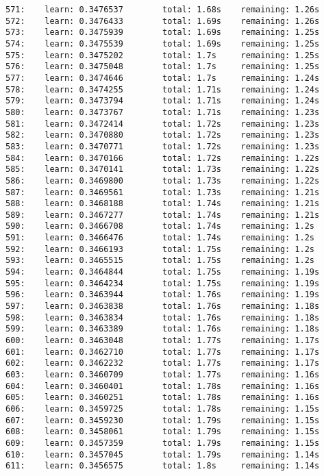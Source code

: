 \documentclass[11pt]{article}
\begin{document}
\begin{Verbatim}[commandchars=\\\{\}]
571:    learn: 0.3476537        total: 1.68s    remaining: 1.26s
572:    learn: 0.3476433        total: 1.69s    remaining: 1.26s
573:    learn: 0.3475939        total: 1.69s    remaining: 1.25s
574:    learn: 0.3475539        total: 1.69s    remaining: 1.25s
575:    learn: 0.3475202        total: 1.7s     remaining: 1.25s
576:    learn: 0.3475048        total: 1.7s     remaining: 1.25s
577:    learn: 0.3474646        total: 1.7s     remaining: 1.24s
578:    learn: 0.3474255        total: 1.71s    remaining: 1.24s
579:    learn: 0.3473794        total: 1.71s    remaining: 1.24s
580:    learn: 0.3473767        total: 1.71s    remaining: 1.23s
581:    learn: 0.3472414        total: 1.72s    remaining: 1.23s
582:    learn: 0.3470880        total: 1.72s    remaining: 1.23s
583:    learn: 0.3470771        total: 1.72s    remaining: 1.23s
584:    learn: 0.3470166        total: 1.72s    remaining: 1.22s
585:    learn: 0.3470141        total: 1.73s    remaining: 1.22s
586:    learn: 0.3469800        total: 1.73s    remaining: 1.22s
587:    learn: 0.3469561        total: 1.73s    remaining: 1.21s
588:    learn: 0.3468188        total: 1.74s    remaining: 1.21s
589:    learn: 0.3467277        total: 1.74s    remaining: 1.21s
590:    learn: 0.3466708        total: 1.74s    remaining: 1.2s
591:    learn: 0.3466476        total: 1.74s    remaining: 1.2s
592:    learn: 0.3466193        total: 1.75s    remaining: 1.2s
593:    learn: 0.3465515        total: 1.75s    remaining: 1.2s
594:    learn: 0.3464844        total: 1.75s    remaining: 1.19s
595:    learn: 0.3464234        total: 1.75s    remaining: 1.19s
596:    learn: 0.3463944        total: 1.76s    remaining: 1.19s
597:    learn: 0.3463838        total: 1.76s    remaining: 1.18s
598:    learn: 0.3463834        total: 1.76s    remaining: 1.18s
599:    learn: 0.3463389        total: 1.76s    remaining: 1.18s
600:    learn: 0.3463048        total: 1.77s    remaining: 1.17s
601:    learn: 0.3462710        total: 1.77s    remaining: 1.17s
602:    learn: 0.3462232        total: 1.77s    remaining: 1.17s
603:    learn: 0.3460709        total: 1.77s    remaining: 1.16s
604:    learn: 0.3460401        total: 1.78s    remaining: 1.16s
605:    learn: 0.3460251        total: 1.78s    remaining: 1.16s
606:    learn: 0.3459725        total: 1.78s    remaining: 1.15s
607:    learn: 0.3459230        total: 1.79s    remaining: 1.15s
608:    learn: 0.3458061        total: 1.79s    remaining: 1.15s
609:    learn: 0.3457359        total: 1.79s    remaining: 1.15s
610:    learn: 0.3457045        total: 1.79s    remaining: 1.14s
611:    learn: 0.3456575        total: 1.8s     remaining: 1.14s

\end{Verbatim}
\end{document}
